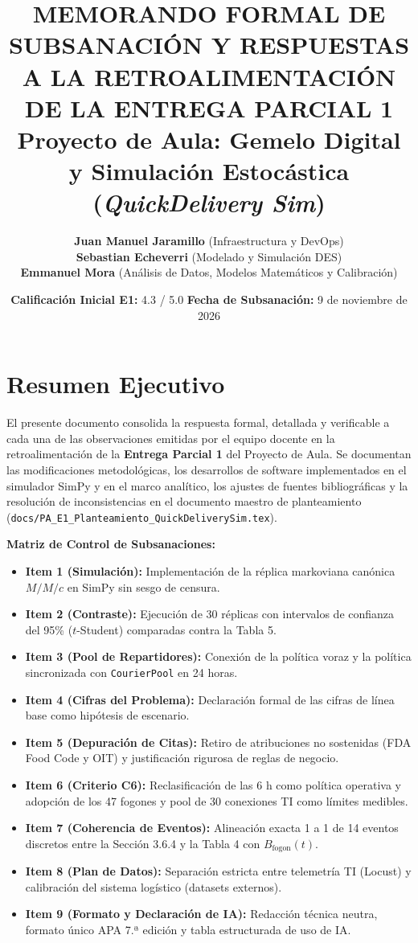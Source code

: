 \documentclass[11pt,letterpaper]{article}
\title{\textbf{\Large MEMORANDO FORMAL DE SUBSANACIÓN Y RESPUESTAS A LA RETROALIMENTACIÓN DE LA ENTREGA PARCIAL 1}\\[0.3em]
\textbf{\large Proyecto de Aula: Gemelo Digital y Simulación Estocástica (\textit{QuickDelivery Sim})}}
\author{\textbf{Juan Manuel Jaramillo} (Infraestructura y DevOps) \\
\textbf{Sebastian Echeverri} (Modelado y Simulación DES) \\
\textbf{Emmanuel Mora} (Análisis de Datos, Modelos Matemáticos y Calibración)}
\date{\textbf{Calificación Inicial E1:} 4.3 / 5.0 \quad \textbar \quad \textbf{Fecha de Subsanación:} 9 de noviembre de 2026}
\begin{document}
\maketitle

\section*{Resumen Ejecutivo}
El presente documento consolida la respuesta formal, detallada y verificable a cada una de las observaciones emitidas por el equipo docente en la retroalimentación de la \textbf{Entrega Parcial 1} del Proyecto de Aula. Se documentan las modificaciones metodológicas, los desarrollos de software implementados en el simulador SimPy y en el marco analítico, los ajustes de fuentes bibliográficas y la resolución de inconsistencias en el documento maestro de planteamiento (\texttt{docs/PA\_E1\_Planteamiento\_QuickDeliverySim.tex}).

\vspace{0.5em}
\noindent \textbf{Matriz de Control de Subsanaciones:}
\begin{itemize}[leftmargin=1.5em, itemsep=0.2em]
    \item \textbf{Item 1 (Simulación):} Implementación de la réplica markoviana canónica $M/M/c$ en SimPy sin sesgo de censura.
    \item \textbf{Item 2 (Contraste):} Ejecución de 30 réplicas con intervalos de confianza del 95\% ($t$-Student) comparadas contra la Tabla 5.
    \item \textbf{Item 3 (Pool de Repartidores):} Conexión de la política voraz y la política sincronizada con \texttt{CourierPool} en 24 horas.
    \item \textbf{Item 4 (Cifras del Problema):} Declaración formal de las cifras de línea base como hipótesis de escenario.
    \item \textbf{Item 5 (Depuración de Citas):} Retiro de atribuciones no sostenidas (FDA Food Code y OIT) y justificación rigurosa de reglas de negocio.
    \item \textbf{Item 6 (Criterio C6):} Reclasificación de las 6 h como política operativa y adopción de los 47 fogones y pool de 30 conexiones TI como límites medibles.
    \item \textbf{Item 7 (Coherencia de Eventos):} Alineación exacta 1 a 1 de 14 eventos discretos entre la Sección 3.6.4 y la Tabla 4 con $B_{\text{fogon}}(t)$.
    \item \textbf{Item 8 (Plan de Datos):} Separación estricta entre telemetría TI (Locust) y calibración del sistema logístico (datasets externos).
    \item \textbf{Item 9 (Formato y Declaración de IA):} Redacción técnica neutra, formato único APA 7.ª edición y tabla estructurada de uso de IA.
\end{itemize}
\end{document}
